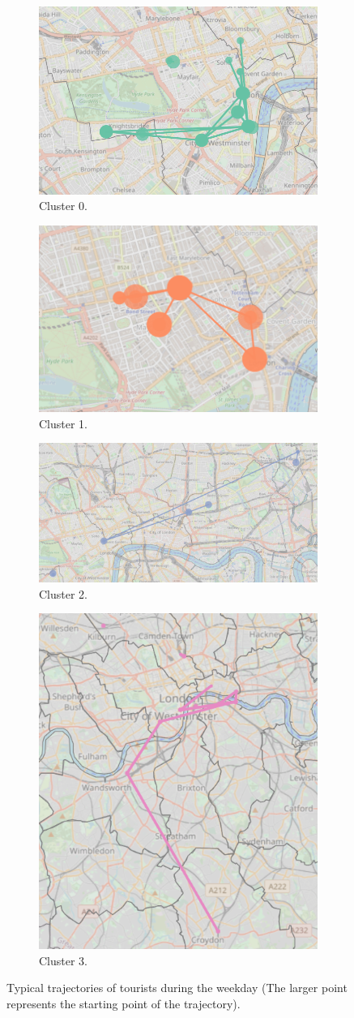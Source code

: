 \documentclass{article}
\theoremstyle{remark}
\begin{document}
\begin{figure}[!h]

\centering
\begin{subfigure}{0.6\textheight}
\centering
\includegraphics[width=0.4\linewidth]{figures/weekday_tourists_c0.png}
\caption{Cluster 0.}
\label{fig:weekday_tourists_c0}
\end{subfigure}
\begin{subfigure}{0.6\textheight}
\centering
\includegraphics[width=0.4\linewidth]{figures/weekday_tourists_c1.png}
\caption{Cluster 1.}
\label{fig:weekday_tourists_c1}
\end{subfigure}
\begin{subfigure}{0.6\textheight}
\centering
\includegraphics[width=0.4\linewidth]{figures/weekday_tourists_c2.png}
\caption{Cluster 2.}
\label{fig:weekday_tourists_c2}
\end{subfigure}
\begin{subfigure}{0.6\textheight}
\centering
\includegraphics[width=0.4\linewidth]{figures/weekday_tourists_c3.png}
\caption{Cluster 3.}
\label{fig:weekday_tourists_c3}
\end{subfigure}

\caption{Typical trajectories of tourists during the weekday (The larger point represents the starting point of the trajectory).}
\label{fig:sequences_weekday_tourists}
\end{figure}
\end{document}
